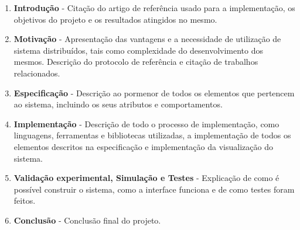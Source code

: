 \begin{enumerate}
    \item \textbf{Introdução} - Citação do artigo de referência usado para a implementação, os objetivos do projeto e os resultados atingidos no mesmo.
    \item \textbf{Motivação} - Apresentação das vantagens e a necessidade de utilização de sistema distribuídos, tais como complexidade do desenvolvimento dos mesmos. Descrição do protocolo de referência e citação de trabalhos relacionados.
    \item \textbf{Especificação} - Descrição ao pormenor de todos os elementos que pertencem ao sistema, incluindo os seus atributos e comportamentos.
    \item \textbf{Implementação} - Descrição de todo o processo de implementação, como linguagens, ferramentas e bibliotecas utilizadas, a implementação de todos os elementos descritos na especificação e implementação da visualização do sistema.
    \item \textbf{Validação experimental, Simulação e Testes} - Explicação de como é possível construir o sistema, como a interface funciona e de como testes foram feitos.
    \item \textbf{Conclusão} - Conclusão final do projeto.

\end{enumerate}
